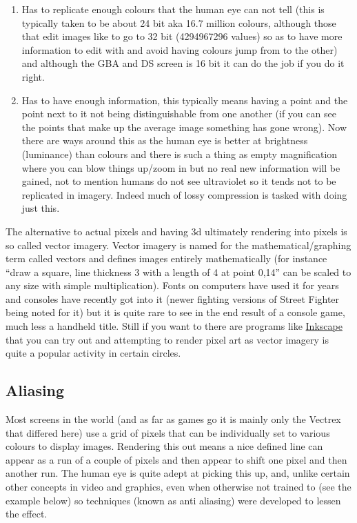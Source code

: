 \documentclass[
]{book}
\providecommand{\tightlist}{%
  \setlength{\itemsep}{0pt}\setlength{\parskip}{0pt}}
\begin{document}
\begin{enumerate}
\def\labelenumi{\arabic{enumi}.}
\tightlist
\item
  Has to replicate enough colours that the human eye can not tell (this is typically taken to be about 24 bit aka 16.7 million colours, although those that edit images like to go to 32 bit (4294967296 values) so as to have more information to edit with and avoid having colours jump from to the other) and although the GBA and DS screen is 16 bit it can do the job if you do it right.
\item
  Has to have enough information, this typically means having a point and the point next to it not being distinguishable from one another (if you can see the points that make up the average image something has gone wrong). Now there are ways around this as the human eye is better at brightness (luminance) than colours and there is such a thing as empty magnification where you can blow things up/zoom in but no real new information will be gained, not to mention humans do not see ultraviolet so it tends not to be replicated in imagery. Indeed much of lossy compression is tasked with doing just this.
\end{enumerate}

The alternative to actual pixels and having 3d ultimately rendering into pixels is so called vector imagery. Vector imagery is named for the mathematical/graphing term called vectors and defines images entirely mathematically (for instance ``draw a square, line thickness 3 with a length of 4 at point 0,14'' can be scaled to any size with simple multiplication). Fonts on computers have used it for years and consoles have recently got into it (newer fighting versions of Street Fighter being noted for it) but it is quite rare to see in the end result of a console game, much less a handheld title. Still if you want to there are programs like \href{http://inkscape.org/}{Inkscape} that you can try out and attempting to render pixel art as vector imagery is quite a popular activity in certain circles.

\hypertarget{aliasing}{%
\subsection{Aliasing}\label{aliasing}}

Most screens in the world (and as far as games go it is mainly only the Vectrex that differed here) use a grid of pixels that can be individually set to various colours to display images. Rendering this out means a nice defined line can appear as a run of a couple of pixels and then appear to shift one pixel and then another run. The human eye is quite adept at picking this up, and, unlike certain other concepts in video and graphics, even when otherwise not trained to (see the example below) so techniques (known as anti aliasing) were developed to lessen the effect.
\end{document}
